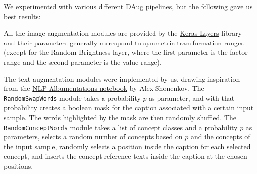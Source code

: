 \documentclass[12pt, a4paper]{article}
\begin{document}
We experimented with various different DAug pipelines, but the following gave us best results:
\begin{center}
\end{center}

All the image augmentation modules are provided by the \href{https://www.tensorflow.org/api_docs/python/tf/keras/layers/}{Keras Layers} library and their parameters generally correspond to symmetric transformation ranges (except for the Random Brightness layer, where the first parameter is the factor range and the second parameter is the value range).

The text augmentation modules were implemented by us, drawing inspiration from the \href{https://www.kaggle.com/code/shonenkov/nlp-albumentations}{NLP Albumentations notebook} by Alex Shonenkov.
The \texttt{RandomSwapWords} module takes a probability $p$ as parameter, and with that probability creates a boolean mask for the caption associated with a certain input sample. The words highlighted by the mask are then randomly shuffled.
The \texttt{RandomConceptWords} module takes a list of concept classes and a probability $p$ as parameters, selects a random number of concepts based on $p$ and the concepts of the input sample, randomly selects a position inside the caption for each selected concept, and inserts the concept reference texts inside the caption at the chosen positions.
\end{document}
